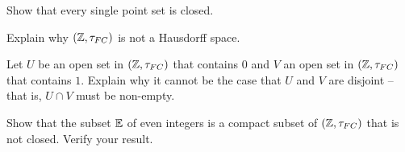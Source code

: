 \ba

\item Show that every single point set is closed.

\item Explain why $(\mathbb{Z}, \tau_{FC})$ is not a Hausdorff space. 

\item Let $U$ be an open set in $(\mathbb{Z}, \tau_{FC})$ that contains $0$ and $V$ an open set in $(\mathbb{Z}, \tau_{FC})$ that contains $1$. Explain why it cannot be the case that $U$ and $V$ are disjoint -- that is, $U \cap V$ must be non-empty.

\item Show that the subset $\mathbb{E}$ of even integers is a compact subset of $(\mathbb{Z}, \tau_{FC})$ that is not closed. Verify your result.

\ea


